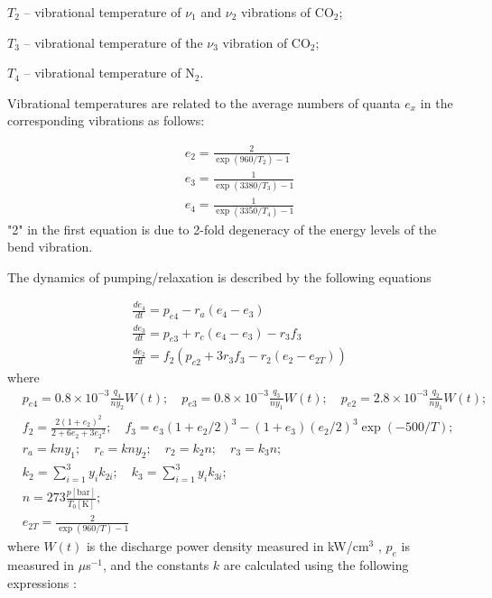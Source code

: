 \documentclass{report}
\begin{document}
$T_2$ – vibrational temperature of $\nu_1$ and $\nu_2$ vibrations of {CO$_2$};

$T_3$ – vibrational temperature of the $\nu_3$ vibration of {CO$_2$};

$T_4$ – vibrational temperature of {N$_2$}.

Vibrational temperatures are related to the average numbers of quanta $e_x$ in the corresponding vibrations as follows:

\begin{equation}\label{eq:e}
\begin{aligned}
&{e_2} = \frac{2}{\exp(960/{T_2})-1}\\
&{e_3} = \frac{1}{\exp(3380/{T_3})-1}\\
&{e_4} = \frac{1}{\exp(3350/{T_4})-1} 
\end{aligned}
\end{equation}
"2" in the first equation is due to 2-fold degeneracy of the energy levels of the bend vibration.

The dynamics of pumping/relaxation is described by the following equations

\begin{equation}\label{eq:dedt}
\begin{aligned}
&\frac{d e_4}{dt} = p_{e4} - r_a (e_4 - e_3)\\
&\frac{d e_3}{dt} = p_{e3} + r_c(e_4 - e_3) - r_3 f_3\\
&\frac{d e_2}{dt} = f_2 \left( p_{e2} + 3 r_3 f_3 - r_2 (e_2 - e_{2T}) \right)
\end{aligned}
\end{equation}
where
\begin{equation}\label{eq:dedt_rates}
\begin{aligned}
&p_{e4} = 0.8\times 10^{-3} \frac{q_4}{n y_2} W(t);\quad p_{e3} = 0.8\times 10^{-3}\frac{q_3}{n y_1} W(t);\quad p_{e2} = 2.8\times 10^{-3}\frac{q_2}{n y_1} W(t);\\
&f_2 = \frac{2(1+e_2)^2}{2+6e_2+3{e_2}^2};\quad f_3 = e_3(1+e_2/2)^3 - (1+e_3)(e_2/2)^3 \exp(- 500/T);\\
&r_a = kny_1;\quad r_c = kny_2;\quad r_2 = k_2n;\quad r_3 = k_3n;\\
&k_2 = \sum\limits_{i=1}^3 y_i k_{2i};\quad k_3 = \sum\limits_{i=1}^3 y_i k_{3i};\\
&n = 273 \frac{p[\text{bar}]}{T_0[\text{K}]};\\
&e_{2T} = \frac{2}{\exp(960/T)-1}
\end{aligned}
\end{equation}
where $W(t)$ is the discharge power density measured in {kW/cm$^3$} , $p_e$ is measured in {$\mu$s$^{-1}$}, and the constants $k$ are calculated using the following expressions \cite{Biryukov-1974,Taylor-1969}:
\end{document}
